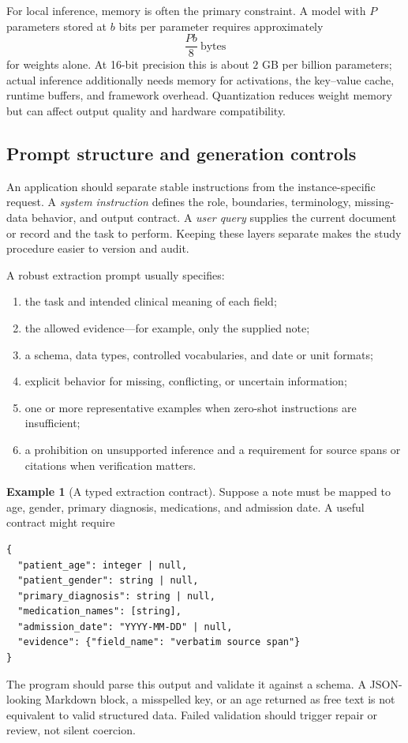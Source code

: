 \documentclass[12pt,oneside]{book}
\numberwithin{equation}{section}
\theoremstyle{definition}
\newtheorem{example}{Example}[section]
\theoremstyle{plain}
\theoremstyle{remark}
\begin{document}
For local inference, memory is often the primary constraint.  A model with
$P$ parameters stored at $b$ bits per parameter requires approximately
\[
    \frac{Pb}{8}\ \text{bytes}
\]
for weights alone.  At 16-bit precision this is about $2$ GB per billion
parameters; actual inference additionally needs memory for activations, the
key--value cache, runtime buffers, and framework overhead.  Quantization reduces
weight memory but can affect output quality and hardware compatibility.

\subsection{Prompt structure and generation controls}

An application should separate stable instructions from the instance-specific
request.  A \emph{system instruction} defines the role, boundaries, terminology,
missing-data behavior, and output contract.  A \emph{user query} supplies the
current document or record and the task to perform.  Keeping these layers
separate makes the study procedure easier to version and audit.

A robust extraction prompt usually specifies:
\begin{enumerate}
    \item the task and intended clinical meaning of each field;
    \item the allowed evidence---for example, only the supplied note;
    \item a schema, data types, controlled vocabularies, and date or unit formats;
    \item explicit behavior for missing, conflicting, or uncertain information;
    \item one or more representative examples when zero-shot instructions are
    insufficient;
    \item a prohibition on unsupported inference and a requirement for source
    spans or citations when verification matters.
\end{enumerate}

\begin{example}[A typed extraction contract]
Suppose a note must be mapped to age, gender, primary diagnosis, medications,
and admission date.  A useful contract might require
\begin{lstlisting}[language={},numbers=none]
{
  "patient_age": integer | null,
  "patient_gender": string | null,
  "primary_diagnosis": string | null,
  "medication_names": [string],
  "admission_date": "YYYY-MM-DD" | null,
  "evidence": {"field_name": "verbatim source span"}
}
\end{lstlisting}
The program should parse this output and validate it against a schema.  A JSON-
looking Markdown block, a misspelled key, or an age returned as free text is not
equivalent to valid structured data.  Failed validation should trigger repair
or review, not silent coercion.
\end{example}
\end{document}
